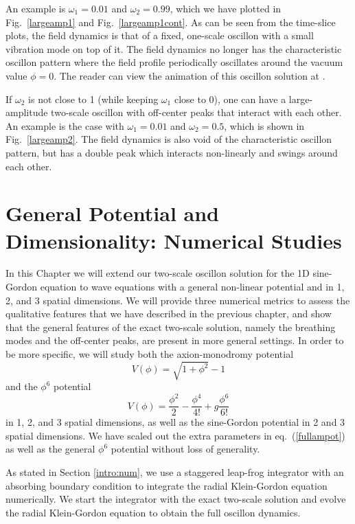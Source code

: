 \documentclass[11pt]{book}
\begin{document}
An example is $\omega_1=0.01$ and $\omega_2=0.99$, which we have plotted in Fig.~\ref{largeamp1} and Fig.~\ref{largeamp1cont}. As can be seen from the time-slice plots, the field dynamics is that of a fixed, one-scale oscillon with a small vibration mode on top of it. The field dynamics no longer has the characteristic oscillon pattern where the field profile periodically oscillates around the vacuum value $\phi=0$. The reader can view the animation of this oscillon solution at \cite{website}.

If $\omega_2$ is not close to 1 (while keeping $\omega_1$ close to 0), one can have a large-amplitude two-scale oscillon with off-center peaks that interact with each other. An example is the case with $\omega_1=0.01$ and $\omega_2=0.5$, which is shown in Fig.~\ref{largeamp2}. The field dynamics is also void of the characteristic oscillon pattern, but has a double peak which interacts non-linearly and swings around each other.

\chapter{General Potential and Dimensionality: Numerical Studies}\label{general}

In this Chapter we will extend our two-scale oscillon solution for the 1D sine-Gordon equation to wave equations with a general non-linear potential and in 1, 2, and 3 spatial dimensions. We will provide three numerical metrics to assess the qualitative features that we have described in the previous chapter, and show that the general features of the exact two-scale solution, namely the breathing modes and the off-center peaks, are present in more general settings. In order to be more specific, we will study both the axion-monodromy potential
\begin{equation}
  V(\phi) = \sqrt{1+\phi^2}-1 \label{axion-potential}
\end{equation}
and the $\phi^6$ potential
\begin{equation}\label{phi6pot}
  V(\phi) = \frac{\phi^2}{2} - \frac{\phi^4}{4!} +g \frac{ \phi^6}{6!}
\end{equation}
in 1, 2, and 3 spatial dimensions, as well as the sine-Gordon potential in 2 and 3 spatial dimensions. We have scaled out the extra parameters in eq.~(\ref{fullampot}) as well as the general $\phi^6$ potential without loss of generality.

As stated in Section \ref{intro:num}, we use a staggered leap-frog integrator with an absorbing boundary condition to integrate the radial Klein-Gordon equation numerically. We start the integrator with the exact two-scale solution and evolve the radial Klein-Gordon equation to obtain the full oscillon dynamics.
\end{document}
